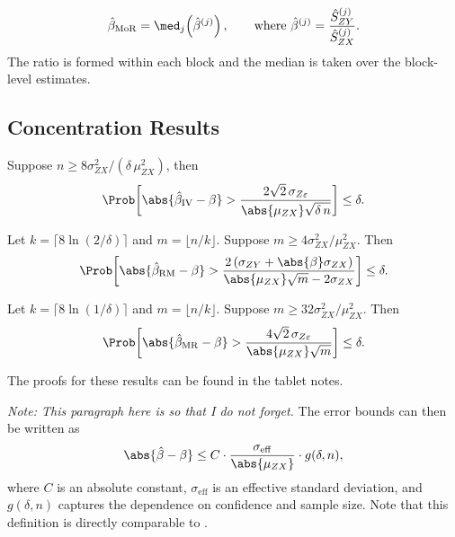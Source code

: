 \begin{definition}
\[
    \hat{\beta}_{\mathrm{MoR}} = \med_j\!\left(\hat{\beta}^{(j)}\right), \qquad \text{where } \hat{\beta}^{(j)} = \frac{\hat{S}_{ZY}^{(j)}}{\hat{S}_{ZX}^{(j)}}.
\]
The ratio is formed within each block and the median is taken over the block-level estimates.
\end{definition}


\subsection{Concentration Results}

\begin{theorem}[Standard IV]
\label{thm:iv_cheb}
Suppose $n \geq 8\sigma_{ZX}^2/(\delta\,\mu_{ZX}^2)$, then
\begin{equation}
\label{eq:iv_bound}
    \Prob\!\left[\abs{\hat{\beta}_{\mathrm{IV}} - \beta} > \frac{2\sqrt{2}\,\sigma_{Z\varepsilon}}{\abs{\mu_{ZX}}\sqrt{\delta\, n}}\right] \leq \delta.
\end{equation}
\end{theorem}

\begin{theorem}
\label{thm:rm}
Let $k = \lceil 8\ln(2/\delta) \rceil$ and $m = \lfloor n/k \rfloor$. Suppose $m \geq 4\sigma_{ZX}^2/\mu_{ZX}^2$. Then
\begin{equation}
\label{eq:rm}
    \Prob\!\left[\abs{\hat{\beta}_{\mathrm{RM}} - \beta} > \frac{2\left(\sigma_{ZY} + \abs{\beta}\sigma_{ZX}\right)}{\abs{\mu_{ZX}}\sqrt{m} - 2\sigma_{ZX}}\right] \leq \delta.
\end{equation}
\end{theorem}
 
\begin{theorem}
\label{thm:mr}
Let $k = \lceil 8\ln(1/\delta) \rceil$ and $m = \lfloor n/k \rfloor$. Suppose $m \geq 32\sigma_{ZX}^2/\mu_{ZX}^2$. Then
\begin{equation}
\label{eq:mr}
    \Prob\!\left[\abs{\hat{\beta}_{\mathrm{MR}} - \beta} > \frac{4\sqrt{2}\,\sigma_{Z\varepsilon}}{\abs{\mu_{ZX}}\sqrt{m}}\right] \leq \delta.
\end{equation}
\end{theorem}
The proofs for these results can be found in the tablet notes.

\textit{Note: This paragraph here is so that I do not forget. }The error bounds can then be written as
\[
    \abs{\hat{\beta} - \beta} \leq C \cdot \frac{\sigma_{\mathrm{eff}}}{\abs{\mu_{ZX}}} \cdot g(\delta, n),
\]
where $C$ is an absolute constant, $\sigma_{\mathrm{eff}}$ is an effective standard deviation, and $g(\delta, n)$ captures the dependence on confidence and sample size. Note that this definition is directly comparable to .


